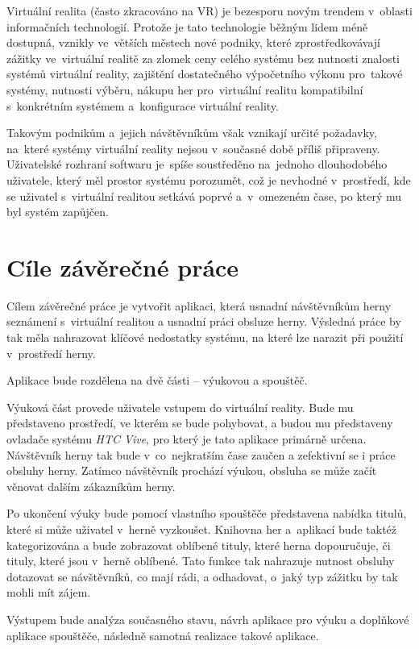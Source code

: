 \documentclass[12pt, a4paper]{article}
\begin{document}
Virtuální realita (často zkracováno na VR) je bezesporu novým trendem v~oblasti informačních technologií. Protože je tato technologie běžným lidem méně dostupná, vznikly ve~větších městech nové podniky, které zprostředkovávají zážitky ve~virtuální realitě za zlomek ceny celého systému bez nutnosti znalosti systémů virtuální reality, zajištění dostatečného výpočetního výkonu pro~takové systémy, nutnosti výběru, nákupu her pro~virtuální realitu kompatibilní s~konkrétním systémem a~konfigurace virtuální reality.\cite{herny}

Takovým podnikům a~jejich návštěvníkům však vznikají určité požadavky, na~které systémy virtuální reality nejsou v~současné době příliš připraveny. Uživatelské rozhraní softwaru je~spíše soustředěno na~jednoho dlouhodobého uživatele, který měl prostor systému porozumět, což je nevhodné v~prostředí, kde se uživatel s~virtuální realitou setkává poprvé a~v~omezeném čase, po který mu byl systém zapůjčen.

\section{Cíle závěrečné práce}

Cílem závěrečné práce je vytvořit aplikaci, která usnadní návštěvníkům herny seznámení s~virtuální realitou a usnadní práci obsluze herny. Výsledná práce by tak měla nahrazovat klíčové nedostatky systému, na které lze narazit při použití v~prostředí herny.

Aplikace bude rozdělena na dvě části -- výukovou a spouštěč.

Výuková část provede uživatele vstupem do virtuální reality. Bude mu představeno prostředí, ve kterém se bude pohybovat, a budou mu představeny ovladače systému \textit{HTC Vive}, pro který je tato aplikace primárně určena. Návštěvník herny tak bude v~co~nejkratším čase zaučen a zefektivní se i práce obsluhy herny. Zatímco návštěvník prochází výukou, obsluha se může začít věnovat dalším zákazníkům herny.

Po ukončení výuky bude pomocí vlastního spouštěče představena nabídka titulů, které si může uživatel v~herně vyzkoušet. Knihovna her a~aplikací bude taktéž kategorizována a bude zobrazovat oblíbené tituly, které herna dopouručuje, či tituly, které jsou v~herně oblíbené. Tato funkce tak nahrazuje nutnost obsluhy dotazovat se návštěvníků, co mají rádi, a odhadovat, o~jaký typ zážitku by tak mohli mít zájem.

Výstupem bude analýza současného stavu, návrh aplikace pro výuku a doplňkové aplikace spouštěče, následně samotná realizace takové aplikace.
\end{document}
